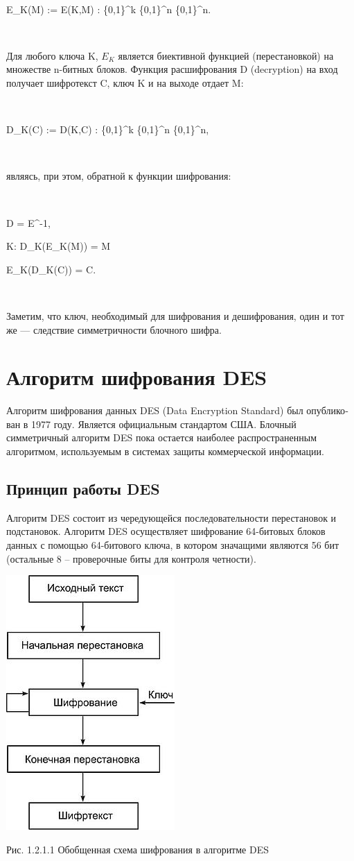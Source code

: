 \documentclass[a4paper]{report}
\begin{document}
~

E_K(M) := E(K,M) : \{0,1\}^k \times \{0,1\}^n \to \{0,1\}^n.

~

Для любого ключа K, $E_K$ является биективной функцией (перестановкой) на множестве n-битных блоков. Функция расшифрования D (decryption) на вход получает шифротекст C, ключ K и на выходе отдает M:

~

D_K(C) := D(K,C) : \{0,1\}^k \times \{0,1\}^n \to \{0,1\}^n,

~

являясь, при этом, обратной к функции шифрования:

~

D = E^{-1},
\medskip

\forall K: D_K(E_K(M)) = M
\medskip

E_K(D_K(C)) = C.

~

Заметим, что ключ, необходимый для шифрования и дешифрования, один и тот же — следствие симметричности блочного шифра.

\section{Алгоритм шифрования DES}
Алгоритм шифрования данных DES (Data Encryption Standard) был опублико­ван в 1977 году. Является официальным стандартом США. Блочный симметричный алгоритм DES пока остается наиболее распространенным алгоритмом, используемым в системах защиты коммерческой информации.

\subsection{Принцип работы DES}

Алгоритм DES состоит из чередующейся последовательности перестановок и подстановок. Алгоритм DES осуществляет шифрование 64-битовых блоков данных с помощью 64-битового ключа, в котором значащими являются 56 бит (остальные 8 – проверочные биты для контроля четности).


\includegraphics[scale=1.4]{DES}
{\centering\caption{\newline Рис. 1.2.1.1 Обобщенная схема шифрования в алгоритме DES}\\}
\end{document}
